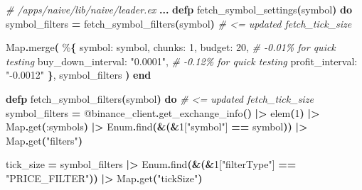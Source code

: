 \documentclass[
  oneside]{book}
\newenvironment{Shaded}{\begin{snugshade}}{\end{snugshade}}
\newcommand{\CommentTok}[1]{\textcolor[rgb]{0.56,0.35,0.01}{\textit{#1}}}
\newcommand{\ConstantTok}[1]{\textcolor[rgb]{0.56,0.35,0.01}{#1}}
\newcommand{\DecValTok}[1]{\textcolor[rgb]{0.00,0.00,0.81}{#1}}
\newcommand{\FunctionTok}[1]{\textcolor[rgb]{0.13,0.29,0.53}{\textbf{#1}}}
\newcommand{\KeywordTok}[1]{\textcolor[rgb]{0.13,0.29,0.53}{\textbf{#1}}}
\newcommand{\NormalTok}[1]{#1}
\newcommand{\OperatorTok}[1]{\textcolor[rgb]{0.81,0.36,0.00}{\textbf{#1}}}
\newcommand{\OtherTok}[1]{\textcolor[rgb]{0.56,0.35,0.01}{#1}}
\newcommand{\StringTok}[1]{\textcolor[rgb]{0.31,0.60,0.02}{#1}}
\newcommand{\VariableTok}[1]{\textcolor[rgb]{0.00,0.00,0.00}{#1}}
\begin{document}
\begin{Shaded}
\begin{Highlighting}[]
  \CommentTok{\# /apps/naive/lib/naive/leader.ex}
  \OperatorTok{...}
  \KeywordTok{defp}\NormalTok{ fetch\_symbol\_settings}\FunctionTok{(}\NormalTok{symbol}\FunctionTok{)} \KeywordTok{do}
\NormalTok{    symbol\_filters }\OperatorTok{=}\NormalTok{ fetch\_symbol\_filters}\FunctionTok{(}\NormalTok{symbol}\FunctionTok{)} \CommentTok{\# \textless{}= updated fetch\_tick\_size}
    
    \ConstantTok{Map}\OperatorTok{.}\NormalTok{merge}\FunctionTok{(}
\NormalTok{      \%}\FunctionTok{\{}
        \VariableTok{symbol:}\NormalTok{ symbol,}
        \VariableTok{chunks:} \DecValTok{1}\NormalTok{,}
        \VariableTok{budget:} \DecValTok{20}\NormalTok{,}
        \CommentTok{\# {-}0.01\% for quick testing}
        \VariableTok{buy\_down\_interval:} \StringTok{"0.0001"}\NormalTok{,}
        \CommentTok{\# {-}0.12\% for quick testing}
        \VariableTok{profit\_interval:} \StringTok{"{-}0.0012"}
      \FunctionTok{\}}\NormalTok{,}
\NormalTok{      symbol\_filters}
    \FunctionTok{)}
  \KeywordTok{end}

  \KeywordTok{defp}\NormalTok{ fetch\_symbol\_filters}\FunctionTok{(}\NormalTok{symbol}\FunctionTok{)} \KeywordTok{do}  \CommentTok{\# \textless{}= updated fetch\_tick\_size}
\NormalTok{    symbol\_filters }\OperatorTok{=}
      \OtherTok{@binance\_client}\OperatorTok{.}\NormalTok{get\_exchange\_info}\FunctionTok{()}
      \OperatorTok{|\textgreater{}}\NormalTok{ elem}\FunctionTok{(}\DecValTok{1}\FunctionTok{)}
      \OperatorTok{|\textgreater{}} \ConstantTok{Map}\OperatorTok{.}\NormalTok{get}\FunctionTok{(}\VariableTok{:symbols}\FunctionTok{)}
      \OperatorTok{|\textgreater{}} \ConstantTok{Enum}\OperatorTok{.}\NormalTok{find}\FunctionTok{(}\OperatorTok{\&}\FunctionTok{(}\OperatorTok{\&}\DecValTok{1}\OtherTok{[}\StringTok{"symbol"}\OtherTok{]} \OperatorTok{==}\NormalTok{ symbol}\FunctionTok{))}
      \OperatorTok{|\textgreater{}} \ConstantTok{Map}\OperatorTok{.}\NormalTok{get}\FunctionTok{(}\StringTok{"filters"}\FunctionTok{)}

\NormalTok{    tick\_size }\OperatorTok{=}
\NormalTok{      symbol\_filters}
      \OperatorTok{|\textgreater{}} \ConstantTok{Enum}\OperatorTok{.}\NormalTok{find}\FunctionTok{(}\OperatorTok{\&}\FunctionTok{(}\OperatorTok{\&}\DecValTok{1}\OtherTok{[}\StringTok{"filterType"}\OtherTok{]} \OperatorTok{==} \StringTok{"PRICE\_FILTER"}\FunctionTok{))}
      \OperatorTok{|\textgreater{}} \ConstantTok{Map}\OperatorTok{.}\NormalTok{get}\FunctionTok{(}\StringTok{"tickSize"}\FunctionTok{)}


\end{Highlighting}
\end{Shaded}
\end{document}
